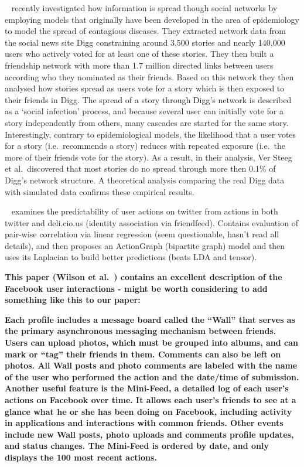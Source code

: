 \documentclass[letterpaper]{article}
\begin{document}
~\cite{ver2011stops} recently investigated how information is spread though social networks by employing models that originally have been developed in the area of epidemiology to model the spread of contagious diseases. They extracted network data from the social news site Digg constraining around 3,500 stories and nearly 140,000 users who actively voted for at least one of these stories. They then built a friendship network with more than 1.7 million directed links between users according who they nominated as their friends. Based on this network they then analysed how stories spread as users vote for a story which is then exposed to their friends in Digg. The spread of a story through Digg's network is described as a `social infection' process, and because several user can initially vote for a  story independently from others, many cascades are started for the same story. Interestingly, contrary to epidemiological models, the likelihood that a user votes for a story (i.e.\ recommends a story) reduces with repeated exposure (i.e.\ the more of their friends vote for the story). As a result, in their analysis, Ver Steeg et al.\ discovered that most stories do no spread through more then 0.1\% of Digg's network structure. A theoretical analysis comparing the real Digg data with simulated data confirms these empirical results.


~\cite{nori2011exploiting} examines the predictability of user actions on twitter from actions in both twitter and deli.cio.us (identity association via friendfeed). Contains evaluation of pair-wise correlation via linear regression (seem questionable, hasn't read all details), and then proposes an ActionGraph (bipartite graph) model and then uses its Laplacian to build better predictions (beats LDA and tensor). 










\textbf{This paper (Wilson et al.~\cite{wilson2009user}) contains an excellent description of the Facebook user interactions - might be worth considering to add something like this to our paper:}


\textbf{Each profile includes a message board called the “Wall” that serves as the primary asynchronous messaging mechanism between friends. Users can upload photos, which must be grouped into albums, and can mark or “tag” their friends in them. Comments can also be left on photos. All Wall posts and photo comments are labeled with the name of the user who performed the action and the date/time of submission. Another useful feature is the Mini-Feed, a detailed log of each user’s actions on Facebook over time. It allows each user’s friends to see at a glance what he or she has been doing on Facebook, including activity in applications and interactions with common friends. Other events include new Wall posts, photo uploads and comments profile updates, and status changes. The Mini-Feed is ordered by date, and only displays the 100 most recent actions.}
\end{document}
